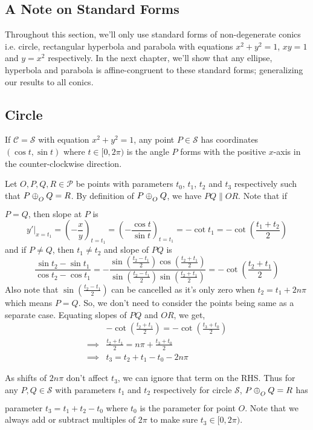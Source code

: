 \subsection*{A Note on Standard Forms}

Throughout this section, we'll only use standard forms of non-degenerate conics
i.e. circle, rectangular hyperbola and parabola with equations $x^2+y^2=1$, $xy=1$
and $y=x^2$ respectively. In the next chapter, we'll show that any ellipse,
hyperbola and parabola is affine-congruent to these standard forms; generalizing
our results to all conics.

\subsection*{Circle}

If $\mathcal{C}=\mathcal{S}$ with equation $x^2+y^2=1$, any point
$P\in\mathcal{S}$ has coordinates $(\cos t,\sin t)$ where $t\in[0,2\pi)$ is the
angle $P$ forms with the positive $x$-axis in the counter-clockwise direction.
\vspace{1ex}

Let $O,P,Q,R\in\mathcal{P}$ be points with parameters $t_0$, $t_1$, $t_2$ and
$t_3$ respectively such that $P \conop Q = R$. By definition of $P \conop Q$, we
have $PQ \parallel OR$. Note that if $P=Q$, then slope at $P$ is
\[
    y'|_{x=t_1} = \left(-\frac{x}{y}\right)_{t=t_1}
    = \left(-\frac{\cos t}{\sin t}\right)_{t=t_1}
                = -\cot t_1
                = -\cot \left(\frac{t_1+t_2}{2}\right)
\]
and if $P \neq Q$, then $t_1 \neq t_2$ and slope of $PQ$ is 
\[
    \frac{\sin t_2 - \sin t_1}{\cos t_2 - \cos t_1}
    = -\frac{\sin\left(\frac{t_2-t_1}{2}\right)\cos\left(\frac{t_2+t_1}{2}\right)}{\sin\left(\frac{t_2-t_1}{2}\right)\sin\left(\frac{t_2+t_1}{2}\right)}
    = -\cot\left(\frac{t_2+t_1}{2}\right)
\]
Also note that $\sin\left(\frac{t_2 - t_1}{2}\right)$ can be cancelled as it's
only zero when $t_2=t_1+2n\pi$ which means $P=Q$. So, we don't need to consider
the points being same as a separate case. Equating slopes of $PQ$ and $OR$, we
get,
\begin{align*}
    &-\cot\left(\frac{t_2+t_1}{2}\right) = -\cot\left(\frac{t_3+t_0}{2}\right) \\
    \implies& \frac{t_2+t_1}{2} = n\pi+\frac{t_3+t_0}{2} \\
    \implies& t_3 = t_2 + t_1 - t_0 - 2n\pi
\end{align*}

\noindent
As shifts of $2n\pi$ don't affect $t_3$, we can ignore that term on the RHS.
Thus for any $P,Q\in\mathcal{S}$ with parameters $t_1$ and $t_2$
respectively for circle $\mathcal{S}$, $P \conop Q = R$ has parameter
$t_3 = t_1 + t_2 - t_0$ where $t_0$ is the parameter for point
$O$. Note that we always add or subtract multiples of $2\pi$ to make sure
$t_3\in[0,2\pi)$.
\vspace{1ex}

